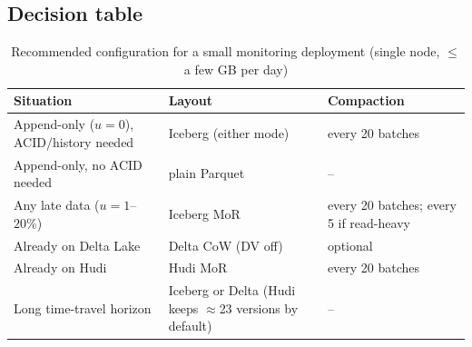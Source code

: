 \documentclass[conference]{IEEEtran}
\begin{document}
\subsection{Decision table}
\begin{table}[ht]\centering
\caption{Recommended configuration for a small monitoring deployment (single node, $\le$ a few GB per day)}\label{tab:decision}
\footnotesize
\begin{tabular}{@{}p{2.6cm}p{2.7cm}p{2.2cm}@{}}\toprule
Situation & Layout & Compaction\\\midrule
Append-only ($u=0$), ACID/history needed & Iceberg (either mode) & every 20 batches\\
Append-only, no ACID needed & plain Parquet & --\\
Any late data ($u=1$--$20\%$) & Iceberg MoR & every 20 batches; every 5 if read-heavy\\
Already on Delta Lake & Delta CoW (DV off) & optional\\
Already on Hudi & Hudi MoR & every 20 batches\\
Long time-travel horizon & Iceberg or Delta (Hudi keeps $\approx$23 versions by default) & --\\\bottomrule
\end{tabular}
\end{table}
\end{document}
